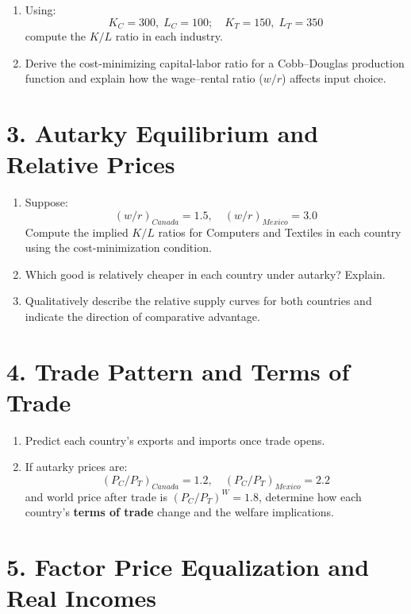 \documentclass[12pt]{article}
\begin{document}
\begin{enumerate}
    \item Using:
    \[
    K_C = 300, \; L_C = 100; \quad K_T = 150, \; L_T = 350
    \]
    compute the \(K/L\) ratio in each industry.
    \item Derive the cost-minimizing capital-labor ratio for a Cobb–Douglas production function and explain how the wage–rental ratio (\(w/r\)) affects input choice.
\end{enumerate}

\section*{3. Autarky Equilibrium and Relative Prices}

\begin{enumerate}
    \item Suppose:
    \[
    (w/r)_{Canada} = 1.5, \quad (w/r)_{Mexico} = 3.0
    \]
    Compute the implied \(K/L\) ratios for Computers and Textiles in each country using the cost-minimization condition.
    \item Which good is relatively cheaper in each country under autarky? Explain.
    \item Qualitatively describe the relative supply curves for both countries and indicate the direction of comparative advantage.
\end{enumerate}

\section*{4. Trade Pattern and Terms of Trade}

\begin{enumerate}
    \item Predict each country’s exports and imports once trade opens.
    \item If autarky prices are:
    \[
    (P_C/P_T)_{Canada} = 1.2, \quad (P_C/P_T)_{Mexico} = 2.2
    \]
    and world price after trade is \( (P_C/P_T)^W = 1.8 \), determine how each country’s \textbf{terms of trade} change and the welfare implications.
\end{enumerate}
\newpage
\section*{5. Factor Price Equalization and Real Incomes}
\end{document}
